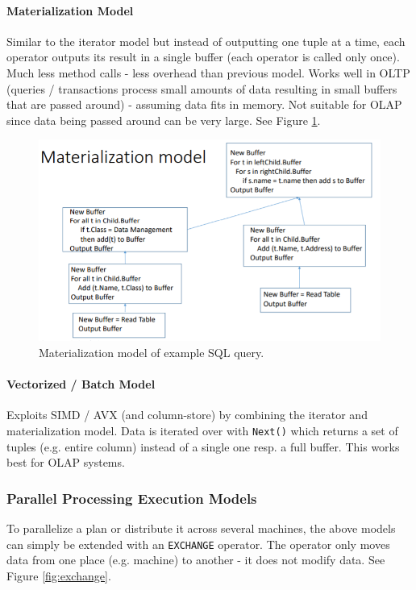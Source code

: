 \paragraph{Materialization Model}
Similar to the iterator model but instead of outputting one tuple at a time, each operator outputs its result in a single buffer (each operator is called only once). Much less method calls - less overhead than previous model. Works well in OLTP (queries / transactions process small amounts of data resulting in small buffers that are passed around) - assuming data fits in memory. Not suitable for OLAP since data being passed around can be very large. See Figure \ref{fig:material}.

\begin{figure}[h]
	\centering
	\includegraphics[scale=0.7]{images/3-material.PNG}
	\caption{Materialization model of example SQL query.}
	\label{fig:material}
\end{figure}

\paragraph{Vectorized / Batch Model}
Exploits SIMD / AVX (and column-store) by combining the iterator and materialization model. Data is iterated over with \texttt{Next()} which returns a set of tuples (e.g. entire column) instead of a single one resp. a full buffer. This works best for OLAP systems. %


\subsubsection{Parallel Processing Execution Models}

To parallelize a plan or distribute it across several machines, the above models can simply be extended with an \texttt{EXCHANGE} operator. The operator only moves data from one place (e.g. machine) to another - it does not modify data. See Figure \ref{fig:exchange}.


